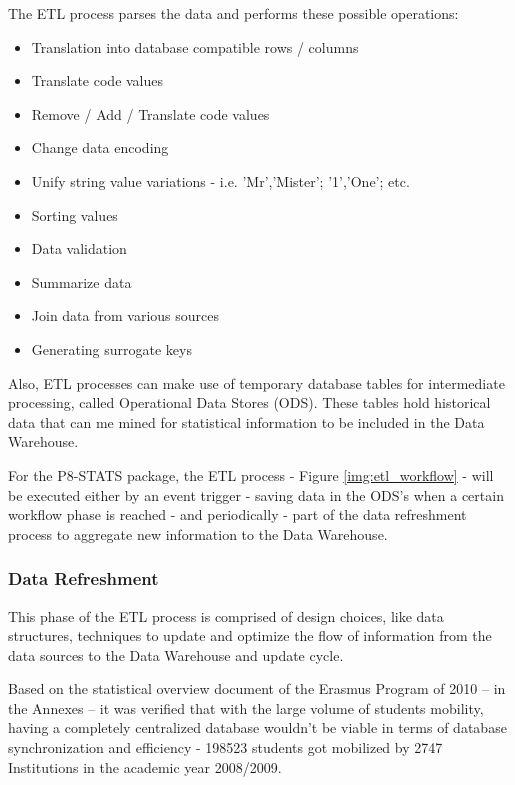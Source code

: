 The ETL process parses the data and performs these possible
operations\cite{wiki:etl}:
\begin{itemize}
  \item Translation into database compatible rows / columns
  \item Translate code values
  \item Remove / Add / Translate code values
  \item Change data encoding
  \item Unify string value variations - i.e. 'Mr','Mister'; '1','One'; etc.
  \item Sorting values
  \item Data validation
  \item Summarize data
  \item Join data from various sources
  \item Generating surrogate keys
\end{itemize}

Also, ETL processes can make use of temporary database tables for intermediate
processing, called Operational Data Stores (ODS). These tables hold historical
data that can me mined for statistical information to be included in the Data
Warehouse.


For the P8-STATS package, the ETL process - Figure \ref{img:etl_workflow} - will
be executed either by an event trigger - saving data in the ODS’s when a certain
workflow phase is reached - and periodically - part of the data refreshment
process to aggregate new information to the Data Warehouse.

\subsubsection{Data Refreshment}

This phase of the ETL process is comprised of design choices, like data
structures, techniques to update and optimize the flow of information from the
data sources to the Data Warehouse and update cycle.

Based on the statistical overview document of the Erasmus Program of 2010 – in
the Annexes – it was verified that with the large volume of students mobility,
having a completely centralized database wouldn't be viable in terms of database
synchronization and efficiency - 198523 students got mobilized by 2747
Institutions in the academic year 2008/2009.

